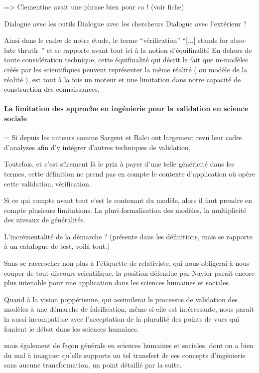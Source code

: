 => Clementine avait une phrase bien pour ca ! (voir fiche)

Dialogue avec les outils
Dialogue avec les chercheurs
Dialogue avec l'extérieur
?

Ainsi dans le cadre de notre étude, le terme \enquote{vérification}  \foreignquote{english}{[...] stands for absolute thruth } \autocite{David2009} \autocite{Oreskes1994} et se rapporte avant tout ici à la notion d'équifinalité \autocite{OSullivan2004} En dehors de toute considération technique, cette équifinalité qui décrit le fait que m-modèles créés par les scientifiques peuvent représenter la même réalité ( ou modèle de la réalité ), est tout à la fois un moteur et une limitation dans notre capacité de construction des connaissances.


\paragraph{La limitation des approche en ingénierie pour la validation en science sociale}

= Si depuis les auteurs comme Sargent et Balci ont largement revu leur cadre d'analyses afin d'y intégrer d'autres techniques de validation,

Toutefois, et c'est sûrement là le prix à payer d'une telle généricité dans les termes, cette définition ne prend pas en compte le contexte d'application où opère cette validation, vérification.

Si ce qui compte avant tout c'est le contenant du modèle, alors il faut prendre en compte plusieurs limitations. La pluri-formalisation des modèles, la multiplicité des niveaux de généralités.

L'incrémentalité de la démarche ? (présente dans les définitions, mais se rapporte à un catalogue de test, voilà tout.)

Sans se raccrocher non plus à l'étiquette de relativiste, qui nous obligerai à nous couper de tout discours scientifique, la position défendue par Naylor parait encore plus intenable pour une application dans les sciences humaines et sociales.

Quand à la vision poppérienne, qui assimilerai le processus de validation des modèles à une démarche de falsification, même si elle est intéressante, nous parait la aussi incompatible avec l'acceptation de la pluralité des points de vues qui fondent le débat dans les sciences humaines.


mais également de façon générale en sciences humaines et sociales, dont on a bien du mal à imaginer qu'elle supporte un tel transfert de ces concepts d’ingénierie sans aucune transformation, un point détaillé par la suite.




